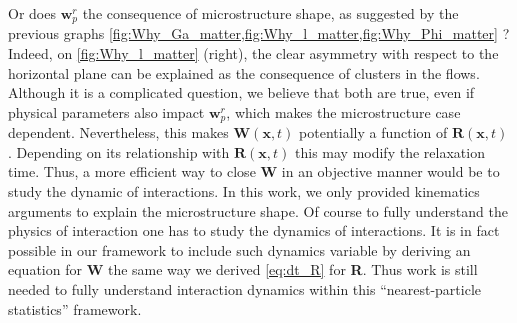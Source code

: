 Or does $\textbf{w}_p^r$ the consequence of microstructure shape, as suggested by the previous graphs \eqref{fig:Why_Ga_matter,fig:Why_l_matter,fig:Why_Phi_matter} ?
Indeed, on \ref{fig:Why_l_matter} (right), the clear asymmetry with respect to the horizontal plane can be explained as the consequence of clusters in the flows. 
Although it is a complicated question, we believe that both are true, even if physical parameters also impact $\textbf{w}_p^r$, which makes the microstructure case dependent.  
Nevertheless, this makes $\textbf{W}(\textbf{x},t)$ potentially a function of $\textbf{R}(\textbf{x},t)$.
Depending on its relationship with $\textbf{R}(\textbf{x},t)$ this may modify the relaxation time.  
Thus, a more efficient way to close \textbf{W} in an objective manner would be to study the dynamic of interactions. 
In this work, we only provided kinematics   arguments to explain the microstructure shape. 
Of course to fully understand the physics of interaction one has to study the dynamics of interactions. 
It is in fact possible in our framework to include such dynamics variable by deriving an equation for \textbf{W} the same way we derived \ref{eq:dt_R} for \textbf{R}.
Thus work is still needed to fully understand interaction dynamics within this ``nearest-particle statistics'' framework. 



